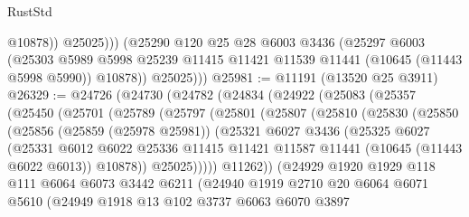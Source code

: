 \begin{lexlean}{RustStd}
\begin{coremodule}
                  @10878))
              @25025)))
        (@25290
          @120
          @25
          @28
          @6003
          @3436
          (@25297
            @6003
            (@25303
              @5989
              @5998
              @25239
              @11415
              @11421
              @11539
              @11441
              (@10645 (@11443 @5998 @5990))
              @10878))
          @25025)))
@25981 := @11191 (@13520 @25 @3911)
@26329 := @24726
    (@24730
      (@24782
        (@24834
          (@24922
            (@25083
              (@25357
                (@25450
                  (@25701
                    (@25789
                      (@25797
                        (@25801
                          (@25807
                            (@25810
                              (@25830
                                (@25850
                                  (@25856
                                    (@25859 (@25978 @25981))
                                    (@25321
                                      @6027
                                      @3436
                                      (@25325
                                        @6027
                                        (@25331
                                          @6012
                                          @6022
                                          @25336
                                          @11415
                                          @11421
                                          @11587
                                          @11441
                                          (@10645 (@11443 @6022 @6013))
                                          @10878))
                                      @25025)))))
                            @11262))
                        (@24929
                          @1920
                          @1929
                          @118
                          @111
                          @6064
                          @6073
                          @3442
                          @6211
                          (@24940
                            @1919
                            @2710
                            @20
                            @6064
                            @6071
                            @5610
                            (@24949
                              @1918
                              @13
                              @102
                              @3737
                              @6063
                              @6070
                              @3897

\end{coremodule}
\end{lexlean}
